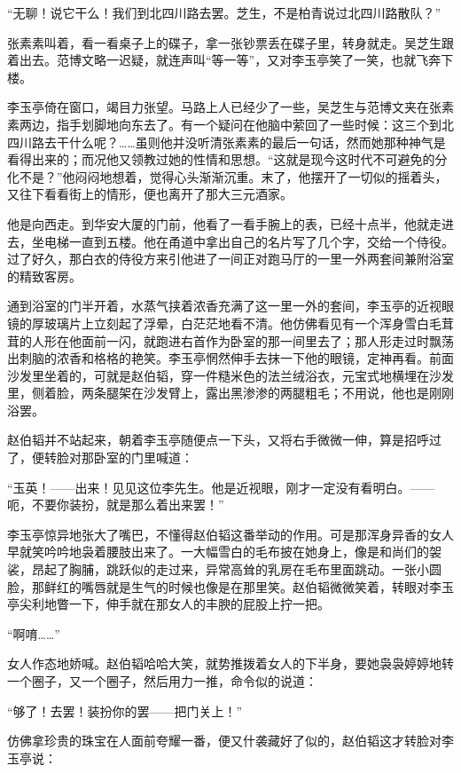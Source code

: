 \par “无聊！说它干么！我们到北四川路去罢。芝生，不是柏青说过北四川路散队？”
\par 张素素叫着，看一看桌子上的碟子，拿一张钞票丢在碟子里，转身就走。吴芝生跟着出去。范博文略一迟疑，就连声叫“等一等”，又对李玉亭笑了一笑，也就飞奔下楼。
\par 李玉亭倚在窗口，竭目力张望。马路上人已经少了一些，吴芝生与范博文夹在张素素两边，指手划脚地向东去了。有一个疑问在他脑中萦回了一些时候：这三个到北四川路去干什么呢？……虽则他并没听清张素素的最后一句话，然而她那种神气是看得出来的；而况他又领教过她的性情和思想。“这就是现今这时代不可避免的分化不是？”他闷闷地想着，觉得心头渐渐沉重。末了，他摆开了一切似的摇着头，又往下看看街上的情形，便也离开了那大三元酒家。
\par 他是向西走。到华安大厦的门前，他看了一看手腕上的表，已经十点半，他就走进去，坐电梯一直到五楼。他在甬道中拿出自己的名片写了几个字，交给一个侍役。过了好久，那白衣的侍役方来引他进了一间正对跑马厅的一里一外两套间兼附浴室的精致客房。
\par 通到浴室的门半开着，水蒸气挟着浓香充满了这一里一外的套间，李玉亭的近视眼镜的厚玻璃片上立刻起了浮晕，白茫茫地看不清。他仿佛看见有一个浑身雪白毛茸茸的人形在他面前一闪，就跑进右首作为卧室的那一间里去了；那人形走过时飘荡出刺脑的浓香和格格的艳笑。李玉亭惘然伸手去抹一下他的眼镜，定神再看。前面沙发里坐着的，可就是赵伯韬，穿一件糙米色的法兰绒浴衣，元宝式地横埋在沙发里，侧着脸，两条腿架在沙发臂上，露出黑渗渗的两腿粗毛；不用说，他也是刚刚浴罢。
\par 赵伯韬并不站起来，朝着李玉亭随便点一下头，又将右手微微一伸，算是招呼过了，便转脸对那卧室的门里喊道：
\par “玉英！——出来！见见这位李先生。他是近视眼，刚才一定没有看明白。——呃，不要你装扮，就是那么着出来罢！”
\par 李玉亭惊异地张大了嘴巴，不懂得赵伯韬这番举动的作用。可是那浑身异香的女人早就笑吟吟地袅着腰肢出来了。一大幅雪白的毛布披在她身上，像是和尚们的袈裟，昂起了胸脯，跳跃似的走过来，异常高耸的乳房在毛布里面跳动。一张小圆脸，那鲜红的嘴唇就是生气的时候也像是在那里笑。赵伯韬微微笑着，转眼对李玉亭尖利地瞥一下，伸手就在那女人的丰腴的屁股上拧一把。
\par “啊唷……”
\par 女人作态地娇喊。赵伯韬哈哈大笑，就势推拨着女人的下半身，要她袅袅婷婷地转一个圈子，又一个圈子，然后用力一推，命令似的说道：
\par “够了！去罢！装扮你的罢——把门关上！”
\par 仿佛拿珍贵的珠宝在人面前夸耀一番，便又什袭藏好了似的，赵伯韬这才转脸对李玉亭说：
